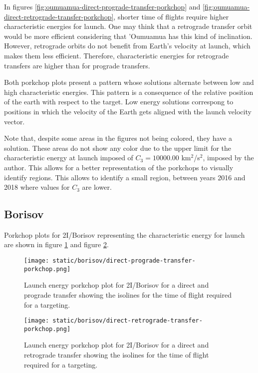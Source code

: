 In figures \ref{fig:oumuamua-direct-prograde-transfer-porkchop} and
\ref{fig:oumuamua-direct-retrograde-transfer-porkchop}, shorter time of flights
require higher characteristic energies for launch. One may think that a
retrograde transfer orbit would be more efficient considering that 'Oumuamua has
this kind of inclination. However, retrograde orbits do not benefit from Earth's
velocity at launch, which makes them less efficient. Therefore, characteristic
energies for retrograde transfers are higher than for prograde transfers.

Both porkchop plots present a pattern whose solutions alternate between low and
high characteristic energies. This pattern is a consequence of the relative
position of the earth with respect to the target. Low energy solutions
correspong to positions in which the velocity of the Earth gets aligned with the
launch velocity vector.

Note that, despite some areas in the figures not being colored, they have a
solution. These areas do not show any color due to the upper limit for the characteristic
energy at launch imposed of $C_3 = 10000.00$ km$^2$/s$^2$, imposed by the
author. This allows for a better representation of the porkchops to visually
identify regions. This allows to identify a small region, between years 2016 and
2018 where values for $C_3$ are lower.

\subsection{Borisov}

Porkchop plots for 2I/Borisov representing the characteristic energy for launch
are shown in figure \ref{fig:borisov-direct-prograde-transfer-porkchop} and
figure \ref{fig:borisov-direct-retrograde-transfer-porkchop}.

\begin{figure}[H]
  \centering
  \texttt{[image: static/borisov/direct-prograde-transfer-porkchop.png]}
        \caption[Direct and prograde launch energy porkchop for
        2I/Borisov]{Launch energy porkchop plot for 2I/Borisov for a direct and prograde
        transfer showing the isolines for
        the time of flight required for a targeting.}
  \label{fig:borisov-direct-prograde-transfer-porkchop}
\end{figure}

\begin{figure}[H]
  \centering
  \texttt{[image: static/borisov/direct-retrograde-transfer-porkchop.png]}
        \caption[Direct and retrograde launch energy porkchop for
        2I/Borisov]{Launch energy porkchop plot for 2I/Borisov for a direct and
        retrograde transfer showing the isolines for
        the time of flight required for a targeting.}
  \label{fig:borisov-direct-retrograde-transfer-porkchop}
\end{figure}

